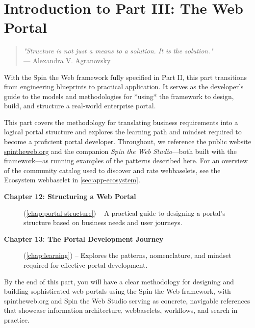 
\chapter*{Introduction to Part III: The Web Portal}
\label{part:implementation}

\begin{quote}
\textit{"Structure is not just a means to a solution. It is the solution."} \\
— Alexandra V. Agranovsky
\end{quote}

With the Spin the Web framework fully specified in Part II, this part transitions from engineering blueprints to practical application. It serves as the developer's guide to the models and methodologies for *using* the framework to design, build, and structure a real-world enterprise portal.

This part covers the methodology for translating business requirements into a logical portal structure and explores the learning path and mindset required to become a proficient portal developer. Throughout, we reference the public website \href{https://spintheweb.org}{spintheweb.org} and the companion \textit{Spin the Web Studio}—both built with the framework—as running examples of the patterns described here. For an overview of the community catalog used to discover and rate webbaselets, see the Ecosystem webbaselet in \cref{sec:app-ecosystem}.
\begin{description}
\item[\textbf{Chapter 12: Structuring a Web Portal}] (\cref{chap:portal-structure}) -- A practical guide to designing a portal's structure based on business needs and user journeys.

\item[\textbf{Chapter 13: The Portal Development Journey}] (\cref{chap:learning}) -- Explores the patterns, nomenclature, and mindset required for effective portal development.
\end{description}

By the end of this part, you will have a clear methodology for designing and building sophisticated web portals using the Spin the Web framework, with spintheweb.org and Spin the Web Studio serving as concrete, navigable references that showcase information architecture, webbaselets, workflows, and search in practice.

